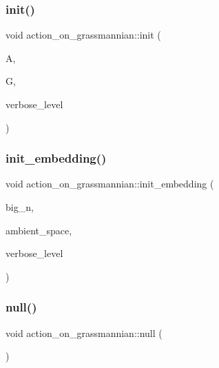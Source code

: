 \subsubsection{\texorpdfstring{init()}{init()}}
{\footnotesize\ttfamily void action\+\_\+on\+\_\+grassmannian\+::init (\begin{DoxyParamCaption}\item[{\mbox{\hyperlink{classaction}{action}} \&}]{A,  }\item[{\mbox{\hyperlink{classgrassmann}{grassmann}} $\ast$}]{G,  }\item[{\mbox{\hyperlink{galois_8h_a09fddde158a3a20bd2dcadb609de11dc}{I\+NT}}}]{verbose\+\_\+level }\end{DoxyParamCaption})}

\mbox{\label{classaction__on__grassmannian_acb563f33fd61018eda4e5aff9da6128f}} 
\subsubsection{\texorpdfstring{init\+\_\+embedding()}{init\_embedding()}}
{\footnotesize\ttfamily void action\+\_\+on\+\_\+grassmannian\+::init\+\_\+embedding (\begin{DoxyParamCaption}\item[{\mbox{\hyperlink{galois_8h_a09fddde158a3a20bd2dcadb609de11dc}{I\+NT}}}]{big\+\_\+n,  }\item[{\mbox{\hyperlink{galois_8h_a09fddde158a3a20bd2dcadb609de11dc}{I\+NT}} $\ast$}]{ambient\+\_\+space,  }\item[{\mbox{\hyperlink{galois_8h_a09fddde158a3a20bd2dcadb609de11dc}{I\+NT}}}]{verbose\+\_\+level }\end{DoxyParamCaption})}

\mbox{\label{classaction__on__grassmannian_a421b7bc55cd0bb3708bfc8b1f3c01488}} 
\subsubsection{\texorpdfstring{null()}{null()}}
{\footnotesize\ttfamily void action\+\_\+on\+\_\+grassmannian\+::null (\begin{DoxyParamCaption}{ }\end{DoxyParamCaption})}

